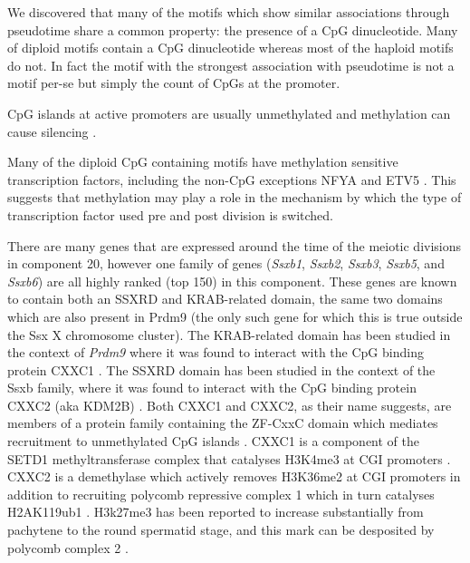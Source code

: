 We discovered that many of the motifs which show similar associations through pseudotime share a common property: the presence of a CpG dinucleotide. Many of diploid motifs contain a CpG dinucleotide whereas most of the haploid motifs do not. In fact the motif with the strongest association with pseudotime is not a motif per-se but simply the count of CpGs at the promoter.

CpG islands at active promoters are usually unmethylated and methylation can cause silencing \parencite{Li2014DNA}. 

Many of the diploid CpG containing motifs have methylation sensitive transcription factors, including the non-CpG exceptions NFYA and ETV5 \parencite{Domcke2015Competition, Wang2017NRF1}. This suggests that methylation may play a role in the mechanism by which the type of transcription factor used pre and post division is switched.

There are many genes that are expressed around the time of the meiotic divisions in component 20, however one family of genes (\textit{Ssxb1}, \textit{Ssxb2}, \textit{Ssxb3}, \textit{Ssxb5}, and \textit{Ssxb6}) are all highly ranked (top 150) in this component. These genes are known to contain both an SSXRD and KRAB-related domain, the same two domains which are also present in Prdm9 (the only such gene for which this is true outside the Ssx X chromosome cluster). The KRAB-related domain has been studied in the context of \textit{Prdm9} where it was found to interact with the CpG binding protein CXXC1 \parencite{Imai2017PRDM9, Parvanov2017PRDM9}. The SSXRD domain has been studied in the context of the Ssxb family, where it was found to interact with the CpG binding protein CXXC2 (aka KDM2B) \parencite{Banito2018SS18SSX}. Both CXXC1 and CXXC2, as their name suggests, are members of a protein family containing the ZF-CxxC domain which mediates recruitment to unmethylated CpG islands \parencite[reviewed in]{Long2013ZFCxxC}. CXXC1 is a component of the SETD1 methyltransferase complex that catalyses H3K4me3 at CGI promoters \parencite{Lee2005CpGbinding}. CXXC2 is a demethylase which actively removes H3K36me2 at CGI promoters in addition to recruiting polycomb repressive complex 1 which in turn catalyses H2AK119ub1 \parencite{He2008H3K36, Farcas2012KDM2B, He2013Kdm2b, Wu2013Fbxl10}. H3k27me3 has been reported to increase substantially from pachytene to the round spermatid stage, and this mark can be desposited by polycomb complex 2 \parencite{Sin2015Poised}.


